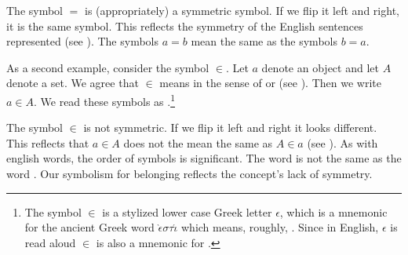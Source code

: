 The symbol $=$ is (appropriately) a symmetric symbol.
If we flip it left and right, it is the same symbol.
This reflects the symmetry of the English sentences represented (see ).
The symbols $a = b$ mean the same as the symbols $b = a$.

%


As a second example, consider the symbol $\in$.
Let $a$ denote an object and let $A$ denote a set.
We agree that $\in$ means  in the sense of  or  (see ).
Then we write $a \in A$.
We read these symbols as .\footnote{The symbol $\in$ is a stylized lower case Greek letter $\epsilon$, which is a mnemonic for the ancient Greek word $\grave{\epsilon} \sigma \tau \acute{\iota}$ which means, roughly, .
Since in English, $\epsilon$ is read aloud  $\in$ is also a mnemonic for .}

The symbol $\in$ is not symmetric.
If we flip it left and right it looks different.
This reflects that $a \in A$ does not the mean the same as $A \in a$ (see ).
As with english words, the order of symbols is significant.
The word  is not the same as the word .
Our symbolism for belonging reflects the concept's lack of symmetry.


